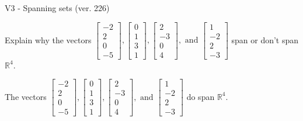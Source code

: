 \begin{exercise}
  \begin{exerciseTitle}V3 - Spanning sets (ver. 226)\end{exerciseTitle}
  \begin{exerciseStatement}
    Explain why the vectors \(\left[\begin{array}{r}
-2 \\
2 \\
0 \\
-5
\end{array}\right] , \left[\begin{array}{r}
0 \\
1 \\
3 \\
1
\end{array}\right] , \left[\begin{array}{r}
2 \\
-3 \\
0 \\
4
\end{array}\right] , \text{ and } \left[\begin{array}{r}
1 \\
-2 \\
2 \\
-3
\end{array}\right]\) span or don't span \(\mathbb{R}^4\). 
	


  \end{exerciseStatement}
  \begin{exerciseAnswer}
   The vectors \(\left[\begin{array}{r}
-2 \\
2 \\
0 \\
-5
\end{array}\right] , \left[\begin{array}{r}
0 \\
1 \\
3 \\
1
\end{array}\right] , \left[\begin{array}{r}
2 \\
-3 \\
0 \\
4
\end{array}\right] , \text{ and } \left[\begin{array}{r}
1 \\
-2 \\
2 \\
-3
\end{array}\right]\) 
  	 do  
	span \(\mathbb{R}^4\).
  


  \end{exerciseAnswer}
\end{exercise}